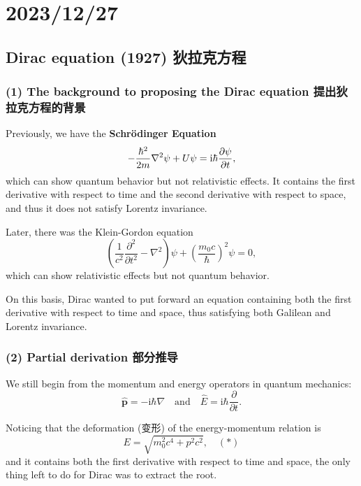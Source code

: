 \chapter{2023/12/27}\label{20231227}

\section{Dirac equation (1927)
狄拉克方程}\label{dirac-equation-1927-ux72c4ux62c9ux514bux65b9ux7a0b}

\subsection*{(1) The background to proposing the Dirac equation
提出狄拉克方程的背景}\label{the-background-to-proposing-the-dirac-equation-ux63d0ux51faux72c4ux62c9ux514bux65b9ux7a0bux7684ux80ccux666f}

Previously, we have the \textbf{Schrödinger Equation}
\[- { \hbar^2 \over 2m} \nabla^2 \psi + U \psi = \mathrm{i} \hbar {\partial \psi \over \partial t},\]
which can show quantum behavior but not relativistic effects. It
contains the first derivative with respect to time and the second
derivative with respect to space, and thus it does not satisfy Lorentz
invariance.

Later, there was the Klein-Gordon equation
\[\left( \frac{1}{c^2} \frac{\partial^2 }{\partial t^2} - \nabla^2 \right) \psi + \left( \frac{m_0c}{\hbar} \right)^2 \psi = 0,\]
which can show relativistic effects but not quantum behavior.

On this basis, Dirac wanted to put forward an equation containing both
the first derivative with respect to time and space, thus satisfying
both Galilean and Lorentz invariance.

\subsection*{(2) Partial derivation
部分推导}\label{partial-derivation-ux90e8ux5206ux63a8ux5bfc}

We still begin from the momentum and energy operators in quantum
mechanics:
\[\hat{\boldsymbol{p}} = - \mathrm{i} \hbar \nabla \quad \text{and} \quad \hat{E} = \mathrm{i} \hbar \frac{\partial}{\partial t}.\]

Noticing that the deformation (变形) of the energy-momentum relation is
\[E = \sqrt{m_0^2 c^4 + p^2 c^2}, \quad (*)\] and it contains both the
first derivative with respect to time and space, the only thing left to
do for Dirac was to extract the root.

